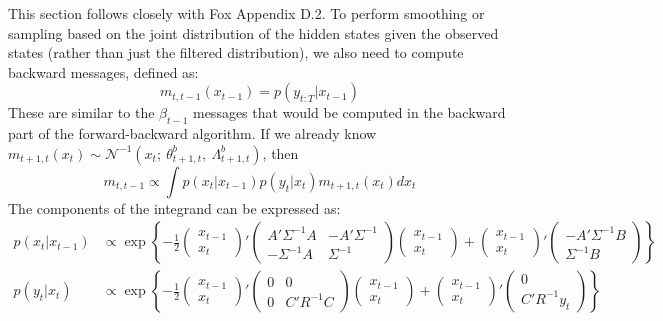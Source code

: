 \documentclass{article} %
\begin{document}
This section follows closely with Fox Appendix D.2. To perform smoothing or sampling based on the joint distribution of the hidden states given the observed states (rather than just the filtered distribution), we also need to compute backward messages, defined as:
\[m_{t,t-1}(x_{t-1}) = p(y_{t:T}|x_{t-1})\]
These are similar to the $\beta_{t-1}$ messages that would be computed in the backward part of the forward-backward algorithm. If we already know $m_{t+1,t}(x_t)\sim\mathcal{N}^{-1}(x_t;~\theta^b_{t+1,t},~\Lambda^b_{t+1,t})$, then
\[m_{t,t-1} \propto \int p(x_t|x_{t-1})p(y_t|x_t)m_{t+1,t}(x_t)dx_t\]
The components of the integrand can be expressed as:
\begin{align*}
p(x_t|x_{t-1})&\propto\exp\left\{-\frac{1}{2}\begin{pmatrix}x_{t-1}\\x_t\end{pmatrix}'\begin{pmatrix}A'\Sigma^{-1}A & -A'\Sigma^{-1}\\-\Sigma^{-1}A & \Sigma^{-1}\end{pmatrix}\begin{pmatrix}x_{t-1}\\x_t\end{pmatrix} + \begin{pmatrix}x_{t-1}\\x_t\end{pmatrix}'\begin{pmatrix}-A'\Sigma^{-1}B\\ \Sigma^{-1}B\end{pmatrix}\right\}\\
p(y_t|x_t)&\propto\exp\left\{-\frac{1}{2}\begin{pmatrix}x_{t-1}\\x_t\end{pmatrix}'\begin{pmatrix}0 & 0\\0 & C'R^{-1}C\end{pmatrix}\begin{pmatrix}x_{t-1}\\x_t\end{pmatrix} + \begin{pmatrix}x_{t-1}\\x_t\end{pmatrix}'\begin{pmatrix}0\\ C'R^{-1}y_t\end{pmatrix}\right\}\\

\end{align*}
\end{document}
